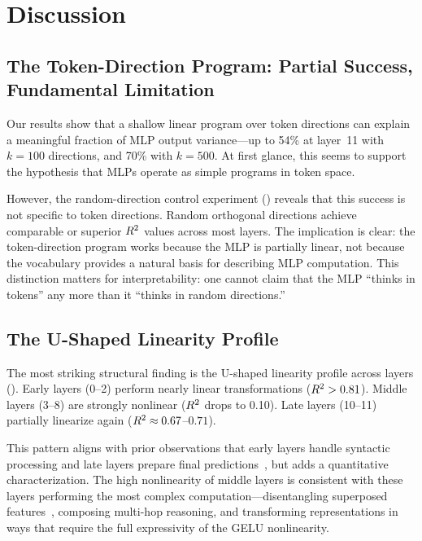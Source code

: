 \section{Discussion}
\label{sec:discussion}

\subsection{The Token-Direction Program: Partial Success, Fundamental Limitation}

Our results show that a shallow linear program over token directions can explain a meaningful fraction of MLP output variance---up to 54\% at layer~11 with $k=100$ directions, and 70\% with $k=500$.
At first glance, this seems to support the hypothesis that MLPs operate as simple programs in token space.

However, the random-direction control experiment () reveals that this success is not specific to token directions.
Random orthogonal directions achieve comparable or superior $R^2$ values across most layers.
The implication is clear: the token-direction program works because the MLP is partially linear, not because the vocabulary provides a natural basis for describing MLP computation.
This distinction matters for interpretability: one cannot claim that the MLP ``thinks in tokens'' any more than it ``thinks in random directions.''

\subsection{The U-Shaped Linearity Profile}

The most striking structural finding is the U-shaped linearity profile across layers ().
Early layers (0--2) perform nearly linear transformations ($R^2 > 0.81$).
Middle layers (3--8) are strongly nonlinear ($R^2$ drops to 0.10).
Late layers (10--11) partially linearize again ($R^2 \approx 0.67$--$0.71$).

This pattern aligns with prior observations that early layers handle syntactic processing and late layers prepare final predictions~\citep{geva2021transformer,meng2022locating}, but adds a quantitative characterization.
The high nonlinearity of middle layers is consistent with these layers performing the most complex computation---disentangling superposed features~\citep{elhage2022toy}, composing multi-hop reasoning, and transforming representations in ways that require the full expressivity of the GELU nonlinearity.

